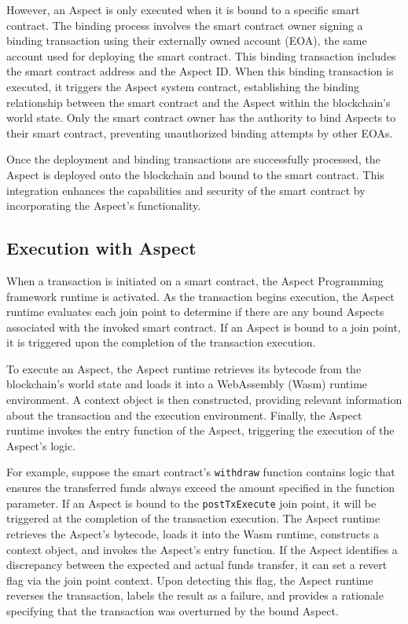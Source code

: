 However, an Aspect is only executed when it is bound to a specific smart contract. The binding process involves the smart contract owner signing a binding transaction using their externally owned account (EOA), the same account used for deploying the smart contract. This binding transaction includes the smart contract address and the Aspect ID. When this binding transaction is executed, it triggers the Aspect system contract, establishing the binding relationship between the smart contract and the Aspect within the blockchain's world state. Only the smart contract owner has the authority to bind Aspects to their smart contract, preventing unauthorized binding attempts by other EOAs.

Once the deployment and binding transactions are successfully processed, the Aspect is deployed onto the blockchain and bound to the smart contract. This integration enhances the capabilities and security of the smart contract by incorporating the Aspect's functionality.

\subsection{Execution with Aspect}
When a transaction is initiated on a smart contract, the Aspect Programming framework runtime is activated. As the transaction begins execution, the Aspect runtime evaluates each join point to determine if there are any bound Aspects associated with the invoked smart contract. If an Aspect is bound to a join point, it is triggered upon the completion of the transaction execution.

To execute an Aspect, the Aspect runtime retrieves its bytecode from the blockchain's world state and loads it into a WebAssembly (Wasm)\cite{webassembly} runtime environment. A context object is then constructed, providing relevant information about the transaction and the execution environment. Finally, the Aspect runtime invokes the entry function of the Aspect, triggering the execution of the Aspect's logic.

For example, suppose the smart contract's \texttt{withdraw} function contains logic that ensures the transferred funds always exceed the amount specified in the function parameter. If an Aspect is bound to the \texttt{postTxExecute} join point, it will be triggered at the completion of the transaction execution. The Aspect runtime retrieves the Aspect's bytecode, loads it into the Wasm runtime, constructs a context object, and invokes the Aspect's entry function. If the Aspect identifies a discrepancy between the expected and actual funds transfer, it can set a revert flag via the join point context. Upon detecting this flag, the Aspect runtime reverses the transaction, labels the result as a failure, and provides a rationale specifying that the transaction was overturned by the bound Aspect.

